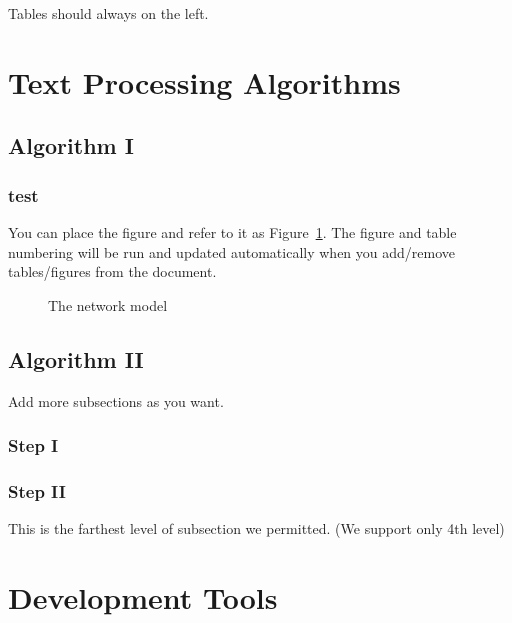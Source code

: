 \documentclass[12pt,oneside,openright,a4paper]{cpe-english-project}
\begin{document}
Tables should always on the left.
\section{Text Processing Algorithms}
\subsection{Algorithm I}
\subsubsection{test}

You can place the figure and refer to it as Figure~\ref{fig:model2}.
The figure and table numbering will be run and updated automatically when you add/remove tables/figures from the document.

\begin{figure}[!h]\centering
\setlength{\fboxrule}{0.2mm} %
\setlength{\fboxsep}{1cm}
\caption{The network model}\label{fig:model2}
\end{figure}

 
\subsection{Algorithm II}
Add more subsections as you want.
\subsubsection{Step I}
\subsubsection{Step II}
This is the farthest level of subsection we permitted. (We support only 4th level)

\section{Development Tools}

\end{document}
